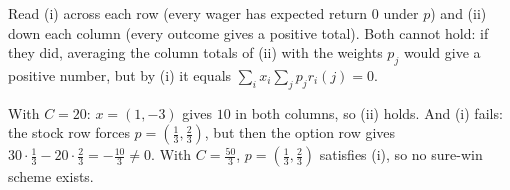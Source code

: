 Read (i) across each row (every wager has expected return $0$ under $p$) and (ii) down each column (every outcome gives a positive total). Both cannot hold: if they did, averaging the column totals of (ii) with the weights $p_j$ would give a positive number, but by (i) it equals $\sum_ix_i\sum_jp_jr_i(j)=0$.

\begin{example}
With $C=20$: $x=(1,-3)$ gives $10$ in both columns, so (ii) holds. And (i) fails: the stock row forces $p=(\frac13,\frac23)$, but then the option row gives $30\cdot\frac13-20\cdot\frac23=-\frac{10}3\ne0$. With $C=\frac{50}3$, $p=(\frac13,\frac23)$ satisfies (i), so no sure-win scheme exists.
\end{example}


